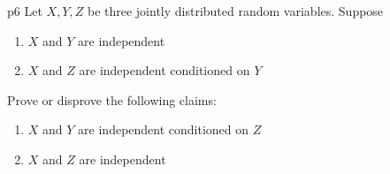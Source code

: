 \documentclass[a4paper, 11pt]{article}
\begin{document}
\begin{problem}{%
	}{p6%
	}
	Let $X,Y,Z$ be three jointly distributed random variables. Suppose \begin{enumerate}[label=(\roman*)]
		\item $X$ and $Y$ are independent
		\item $X$ and $Z$ are independent conditioned on $Y$
	\end{enumerate}
Prove or disprove the following claims:
 \begin{enumerate}[label=(\roman*)]
 	\item $X$ and $Y$ are independent conditioned on $Z$
 	\item $X$ and $Z$ are independent
 \end{enumerate}
\end{problem}
\end{document}
